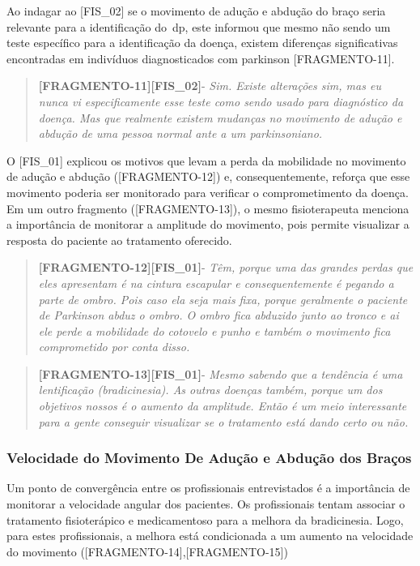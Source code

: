
Ao indagar ao [FIS\_02] se o movimento de adução e abdução do braço seria relevante para a identificação do~\ac{dp}, este informou que mesmo não sendo um teste específico para a identificação da doença, existem diferenças significativas encontradas em indivíduos diagnosticados com parkinson [FRAGMENTO-11].
\begin{quote}
\textbf{[FRAGMENTO-11][FIS\_02]}-
\emph{
Sim. Existe alterações sim, mas eu nunca vi especificamente esse teste como sendo usado para diagnóstico da doença. Mas que realmente existem mudanças no movimento de adução e abdução de uma pessoa normal ante a um parkinsoniano.
}
\end{quote}

O [FIS\_01] explicou os motivos que levam a perda da mobilidade no movimento de adução e abdução ([FRAGMENTO-12]) e, consequentemente, reforça que esse movimento poderia ser monitorado para verificar o comprometimento da doença. Em um outro fragmento ([FRAGMENTO-13]), o mesmo fisioterapeuta menciona a importância de monitorar a amplitude do movimento, pois permite visualizar a resposta do paciente ao tratamento oferecido.

\begin{quote}
\textbf{[FRAGMENTO-12][FIS\_01]}-
\emph{
Têm, porque uma das grandes perdas que eles apresentam é na cintura escapular e consequentemente é pegando a parte de ombro. Pois caso ela seja mais fixa, porque geralmente o paciente de Parkinson abduz o ombro. O ombro fica abduzido junto ao tronco e ai ele perde a mobilidade do cotovelo e punho e também o movimento fica comprometido por conta disso.
}
\end{quote}

\begin{quote}
\textbf{[FRAGMENTO-13][FIS\_01]}-
\emph{
Mesmo sabendo que a tendência é uma lentificação (bradicinesia).  As outras doenças também, porque um dos objetivos nossos é o aumento da amplitude. Então é um meio interessante para a gente conseguir visualizar se o tratamento está dando certo ou não.
}
\end{quote}



\subsubsection{Velocidade do Movimento De Adução e Abdução dos Braços}
Um ponto de convergência entre os profissionais entrevistados é a importância de monitorar a velocidade angular dos pacientes. Os profissionais tentam associar o tratamento fisioterápico e medicamentoso para a melhora da bradicinesia. Logo, para estes profissionais, a melhora está condicionada a um aumento na velocidade do movimento ([FRAGMENTO-14],[FRAGMENTO-15])

